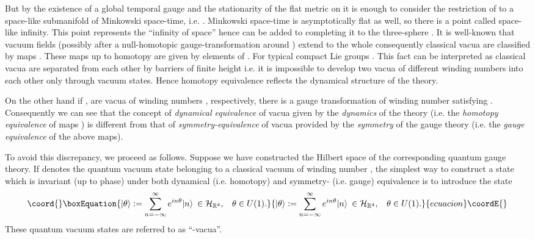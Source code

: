 \documentclass[a4paper,12pt,draft]{article}
\providecommand{\Z}{{\mathbb Z}}
\providecommand{\R}{{\mathbb R}}
\begin{document}
But by the existence of a global temporal gauge and the
stationarity of the flat metric on \myHighlight{$\R^4$}\coordHE{} it is enough to consider
the restriction of \coordHE{} to a space-like submanifold of Minkowski
space-time, i.e. \myHighlight{$f: \R^3\rightarrow G$}\coordHE{}. Minkowski space-time is
asymptotically flat as well, so there is a point \coordHE{} called 
space-like infinity. This point represents the ``infinity of space''
hence can be added to \myHighlight{$\R^3$}\coordHE{} completing it to the
three-sphere \myHighlight{$\R^3\cup\{i^0\}=S^3$}\coordHE{}. It is well-known that vacuum fields
(possibly after a null-homotopic gauge-transformation around \coordHE{}) 
extend to the whole \coordHE{} consequently classical vacua are classified by
maps \coordHE{}. These maps up to homotopy are given by
elements of \coordHE{}. For typical compact Lie groups \myHighlight{$\pi_3(G)\cong\Z$}\coordHE{}. 
This fact can be interpreted as classical vacua are separated 
from each other by barriers of finite height i.e. it is impossible to
develop two vacua of different winding numbers into each other only
through vacuum states. Hence homotopy equivalence reflects the dynamical
structure of the theory.

On the other hand if \coordHE{}, \coordHE{} are vacua of winding numbers \coordHE{},
\coordHE{} respectively, there is a gauge transformation \coordHE{}
of winding number \coordHE{} satisfying \coordHE{}. Consequently we can see
that the concept of {\it dynamical equivalence} of vacua given by the {\it
dynamics} of the theory (i.e. the {\it homotopy equivalence} of maps \coordHE{}) is different from that of {\it symmetry-equivalence} of
vacua provided by the {\it symmetry} of the gauge theory (i.e. the {\it
gauge equivalence} of the above maps). 

To avoid this discrepancy, we proceed as follows. Suppose we have
constructed the Hilbert space \myHighlight{${\cal
H}_{\R^4}$}\coordHE{} of the corresponding quantum gauge theory. If \myHighlight{$\vert
n\rangle\in{\cal H}_{\R^4}$}\coordHE{} denotes the  quantum vacuum state belonging to
a classical vacuum \coordHE{} of winding number \coordHE{}, the simplest way to
construct a state which is invariant (up to phase) under both dynamical
(i.e. homotopy) and symmetry- (i.e. gauge)  equivalence is to introduce
the state
\begin{equation}\coord{}\boxEquation{
\vert\theta\rangle 
:=\sum\limits_{n=-\infty}^{\infty}e^{in\theta}\vert n\rangle\:\in{\cal
H}_{\R^4} ,\:\:\:\:\theta\in U(1).
\label{teta}
}{
\vert\theta\rangle 
:=\sum\limits_{n=-\infty}^{\infty}e^{in\theta}\vert n\rangle\:\in{\cal
H}_{\R^4} ,\:\:\:\:\theta\in U(1).
}{ecuacion}\coordE{}\end{equation}
These quantum vacuum states are referred to as ``\myHighlight{$\theta$}\coordHE{}-vacua''. 
\end{document}
